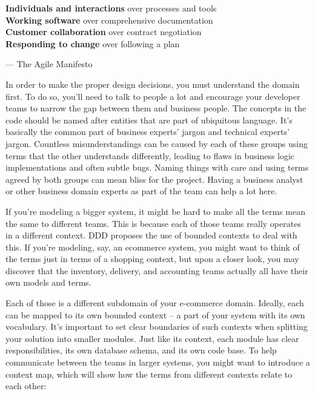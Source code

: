 \noindent
\hspace*{0.8cm}\textbf{Individuals and interactions} over processes and tools \\
\hspace*{0.8cm}\textbf{Working software} over comprehensive documentation \\
\hspace*{0.8cm}\textbf{Customer collaboration} over contract negotiation \\
\hspace*{0.8cm}\textbf{Responding to change} over following a plan

\noindent
\hspace*{0.8cm}— The Agile Manifesto


In order to make the proper design decisions, you must understand the domain first. To do so, you'll need to talk to people a lot and encourage your developer teams to narrow the gap between them and business people. The concepts in the code should be named after entities that are part of ubiquitous language. It's basically the common part of business experts' jargon and technical experts' jargon. Countless misunderstandings can be caused by each of these groups using terms that the other understands differently, leading to flaws in business logic implementations and often subtle bugs. Naming things with care and using terms agreed by both groups can mean bliss for the project. Having a business analyst or other business domain experts as part of the team can help a lot here.

If you're modeling a bigger system, it might be hard to make all the terms mean the same to different teams. This is because each of those teams really operates in a different context. DDD proposes the use of bounded contexts to deal with this. If you're modeling, say, an ecommerce system, you might want to think of the terms just in terms of a shopping context, but upon a closer look, you may discover that the inventory, delivery, and accounting teams actually all have their own models and terms.

Each of those is a different subdomain of your e-commerce domain. Ideally, each can be mapped to its own bounded context – a part of your system with its own vocabulary. It's important to set clear boundaries of such contexts when splitting your solution into smaller modules. Just like its context, each module has clear responsibilities, its own database schema, and its own code base. To help communicate between the teams in larger systems, you might want to introduce a context map, which will show how the terms from different contexts relate to each other:

